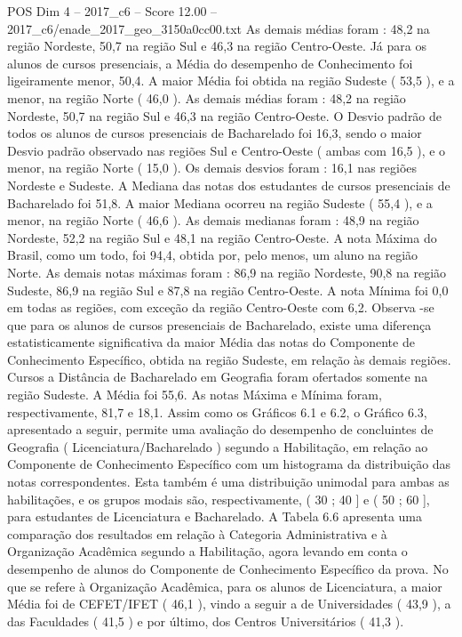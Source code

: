 \begin{textsample}{POS Dim 4 – 2017\_c6 – Score 12.00 – 2017\_c6/enade\_2017\_geo\_3150a0cc00.txt}
As demais médias foram : 48,2 na região Nordeste, 50,7 na região Sul e 46,3 na região Centro-Oeste.
Já para os alunos de cursos presenciais, a Média do desempenho de Conhecimento foi ligeiramente menor, 50,4.
A maior Média foi obtida na região Sudeste ( 53,5 ), e a menor, na região Norte ( 46,0 ).
As demais médias foram : 48,2 na região Nordeste, 50,7 na região Sul e 46,3 na região Centro-Oeste.
O Desvio padrão de todos os alunos de cursos presenciais de Bacharelado foi 16,3, sendo o maior Desvio padrão observado nas regiões Sul e Centro-Oeste ( ambas com 16,5 ), e o menor, na região Norte ( 15,0 ).
Os demais desvios foram : 16,1 nas regiões Nordeste e Sudeste.
A Mediana das notas dos estudantes de cursos presenciais de Bacharelado foi 51,8.
A maior Mediana ocorreu na região Sudeste ( 55,4 ), e a menor, na região Norte ( 46,6 ).
As demais medianas foram : 48,9 na região Nordeste, 52,2 na região Sul e 48,1 na região Centro-Oeste.
A nota Máxima do Brasil, como um todo, foi 94,4, obtida por, pelo menos, um aluno na região Norte.
As demais notas máximas foram : 86,9 na região Nordeste, 90,8 na região Sudeste, 86,9 na região Sul e 87,8 na região Centro-Oeste.
A nota Mínima foi 0,0 em todas as regiões, com exceção da região Centro-Oeste com 6,2.
Observa -se que para os alunos de cursos presenciais de Bacharelado, existe uma diferença estatisticamente significativa da maior Média das notas do Componente de Conhecimento Específico, obtida na região Sudeste, em relação às demais regiões.
Cursos a Distância de Bacharelado em Geografia foram ofertados somente na região Sudeste.
A Média foi 55,6.
As notas Máxima e Mínima foram, respectivamente, 81,7 e 18,1.
Assim como os Gráficos 6.1 e 6.2, o Gráfico 6.3, apresentado a seguir, permite uma avaliação do desempenho de concluintes de Geografia ( Licenciatura/Bacharelado ) segundo a Habilitação, em relação ao Componente de Conhecimento Específico com um histograma da distribuição das notas correspondentes.
Esta também é uma distribuição unimodal para ambas as habilitações, e os grupos modais são, respectivamente, ( 30 ; 40 ] e ( 50 ; 60 ], para estudantes de Licenciatura e Bacharelado.
A Tabela 6.6 apresenta uma comparação dos resultados em relação à Categoria Administrativa e à Organização Acadêmica segundo a Habilitação, agora levando em conta o desempenho de alunos do Componente de Conhecimento Específico da prova.
No que se refere à Organização Acadêmica, para os alunos de Licenciatura, a maior Média foi de CEFET/IFET ( 46,1 ), vindo a seguir a de Universidades ( 43,9 ), a das Faculdades ( 41,5 ) e por último, dos Centros Universitários ( 41,3 ).

\end{textsample}
